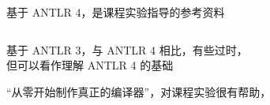 
\begin{frame}{}
  \begin{columns}
  \end{columns}

  \vspace{0.50cm}
  \begin{center}
    基于 ANTLR 4，是课程实验指导的参考资料
  \end{center}
\end{frame}

\begin{frame}{}
  \begin{columns}
  \end{columns}

  \vspace{0.50cm}
  \begin{center}
    基于 ANTLR 3，与 ANTLR 4 相比，有些过时，\\[3pt]
    但可以看作理解 ANTLR 4 的基础
  \end{center}
\end{frame}

\begin{frame}{}
  \begin{center}
    ``从零开始制作真正的编译器''，对课程实验很有帮助，
  \end{center}
\end{frame}

